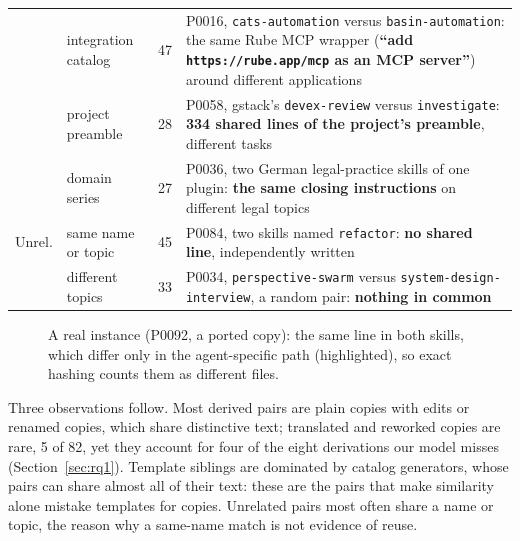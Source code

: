 \documentclass[sigconf,screen]{acmart}
\begin{document}
\begin{table}[t]
\begin{tabular}{>{\raggedright\arraybackslash}p{}>{\raggedright\arraybackslash}p{}r>{\raggedright\arraybackslash}p{}}
 & integration catalog & 47 & P0016, \texttt{cats-automation} versus \texttt{basin-automation}: the same Rube MCP wrapper (\textbf{``add \texttt{https://rube.app/mcp} as an MCP server''}) around different applications \\
 & project preamble & 28 & P0058, gstack's \texttt{devex-review} versus \texttt{investigate}: \textbf{334 shared lines of the project's preamble}, different tasks \\
 & domain series & 27 & P0036, two German legal-practice skills of one plugin: \textbf{the same closing instructions} on different legal topics \\
\midrule
Unrel. & same name or topic & 45 & P0084, two skills named \texttt{refactor}: \textbf{no shared line}, independently written \\
 & different topics & 33 & P0034, \texttt{perspective-swarm} versus \texttt{system-design-interview}, a random pair: \textbf{nothing in common} \\
\bottomrule
\end{tabular}
\end{table}
 
\begin{figure}[t]
  \centering
  \caption{A real instance (P0092, a ported copy): the same line in both skills, which differ only in the agent-specific path (highlighted), so exact hashing counts them as different files.}
  \label{fig:example}
\end{figure}
 
Three observations follow. Most derived pairs are plain copies with edits or renamed copies, which share distinctive text; translated and reworked copies are rare, 5 of 82, yet they account for four of the eight derivations our model misses (Section~\ref{sec:rq1}). Template siblings are dominated by catalog generators, whose pairs can share almost all of their text: these are the pairs that make similarity alone mistake templates for copies. Unrelated pairs most often share a name or topic, the reason why a same-name match is not evidence of reuse.
\end{document}
